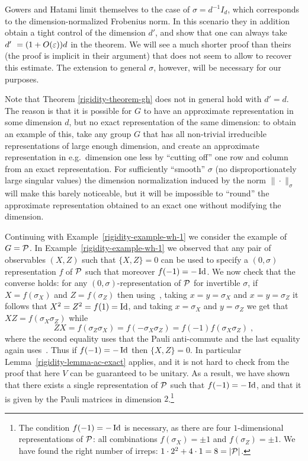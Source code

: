 Gowers and Hatami limit themselves to the case of $\sigma = d^{-1}I_d$, which corresponds to the dimension-normalized Frobenius norm. In this scenario they in addition obtain a tight control of the dimension $d'$, and show that one can always take $d'\ = (1+O(\varepsilon))d$ in the theorem. We will see a much shorter proof than theirs (the proof is implicit in their argument) that does not seem to allow to recover this estimate. The extension to general $\sigma$, however, will be necessary for our purposes.

Note that  Theorem \ref{rigidity-theorem-gh} does not in general hold  with $d'=d$. The reason is that it is possible for $G$ to have an approximate representation in some dimension $d$, but no exact representation of the same dimension: to obtain an example of this, take any group $G$ that has all non-trivial irreducible representations of large enough dimension, and create an approximate representation in e.g.\ dimension one less by ``cutting off'' one row and column from an exact representation. For sufficiently ``smooth'' $\sigma$ (no disproportionately large singular values) the dimension normalization induced by the norm $\|\cdot\|_\sigma$ will make this barely  noticeable, but it will be impossible to ``round'' the approximate representation obtained to an exact one without modifying the dimension. 

\begin{example}
\label{example-wh-3}
Continuing with Example~\ref{rigidity-example-wh-1} we consider the example of $G= \mathcal{P}$. In Example~\ref{rigidity-example-wh-1} we observed that any pair of observables $(X,Z)$ such that $\{X,Z\}=0$ can be used to specify a $(0,\sigma)$ representation $f$ of $\mathcal{P}$ such that moreover $f(-1)=-\mathop{\rm Id}\nolimits$. We now check that the converse holds: for any $(0,\sigma)$-representation of $\mathcal{P}$ for invertible $\sigma$, if $X=f(\sigma_X)$ and $Z=f(\sigma_Z)$ then using~, taking $x=y=\sigma_X$ and $x=y=\sigma_Z$ it follows that $X^2 = Z^2=f(1)=\mathop{\rm Id}\nolimits$, and taking $x=\sigma_X$ and $y=\sigma_Z$ we get that $XZ=f(\sigma_X \sigma_Z)$ while 
\[ZX=f(\sigma_Z\sigma_X)=f(-\sigma_X\sigma_Z)=f(-1)f(\sigma_X\sigma_Z)\;,\]
where the second equality uses that the Pauli anti-commute and the last equality again uses~. Thus if $f(-1)=-\mathop{\rm Id}\nolimits$ then 
 $\{X,Z\}=0$. In particular Lemma~\ref{rigidity-lemma-ac-exact} applies, and it is not hard to check from the proof that here $V$ can be guaranteed to be unitary. As a result, we have shown that there exists a single  representation of $\mathcal{P}$ such that $f(-1)=-\mathop{\rm Id}\nolimits$, and that it is given by the Pauli matrices in dimension $2$.\footnote{The condition $f(-1)=-\mathop{\rm Id}\nolimits$ is necessary, as there are four $1$-dimensional representations of $\mathcal{P}$: all combinations $f(\sigma_X)=\pm 1$ and $f(\sigma_Z)=\pm 1$. We have found the right number of irreps: $1\cdot 2^2 + 4\cdot 1 = 8 = |\mathcal{P}|$.}
\end{example}

